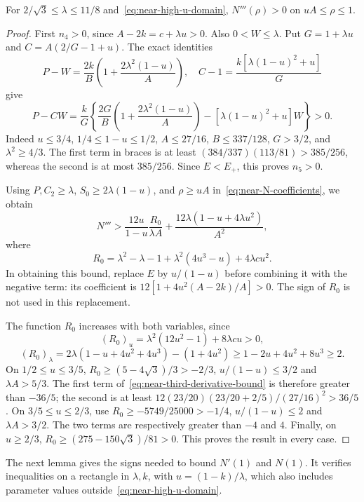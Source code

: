 \begin{lemma}\label{lem:near-high-curvature}
For $2/\sqrt3\le\lambda\le11/8$ and~\eqref{eq:near-high-u-domain}, $N'''(\rho)>0$ on $uA\le\rho\le1$.
\end{lemma}
\begin{proof}
First $n_4>0$, since $A-2k=c+\lambda u>0$. Also $0<W\le\lambda$. Put $G=1+\lambda u$ and $C=A(2/G-1+u)$. The exact identities
\[
 P-W=\frac{2k}{B}\left(1+\frac{2\lambda^2(1-u)}A\right),\quad
 C-1=\frac{k[\lambda(1-u)^2+u]}G
\]
give
\[
 P-CW=\frac kG\left\{\frac{2G}{B}
       \left(1+\frac{2\lambda^2(1-u)}A\right)
       -[\lambda(1-u)^2+u]W\right\}>0.
\]
Indeed $u\le3/4$, $1/4\le1-u\le1/2$, $A\le27/16$, $B\le337/128$, $G>3/2$, and $\lambda^2\ge4/3$. The first term in braces is at least $(384/337)(113/81)>385/256$, whereas the second is at most $385/256$. Since $E<E_+$, this proves $n_5>0$.

Using $P,C_2\ge\lambda$, $S_0\ge2\lambda(1-u)$, and $\rho\ge uA$ in~\eqref{eq:near-N-coefficients}, we obtain
\begin{equation}\label{eq:near-third-derivative-bound}
 N'''>\frac{12u}{1-u}\frac{R_0}{\lambda A}
              +\frac{12\lambda(1-u+4\lambda u^2)}{A^2},
\end{equation}
where
\[
 R_0=\lambda^2-\lambda-1+\lambda^2(4u^3-u)+4\lambda cu^2.
\]
In obtaining this bound, replace $E$ by $u/(1-u)$ before combining it with the negative term: its coefficient is $12[1+4u^2(A-2k)/A]>0$. The sign of $R_0$ is not used in this replacement.

The function $R_0$ increases with both variables, since
\[
 (R_0)_u=\lambda^2(12u^2-1)+8\lambda cu>0,
\]
\[
 (R_0)_\lambda=2\lambda(1-u+4u^2+4u^3)-(1+4u^2)
 \ge1-2u+4u^2+8u^3\ge2.
\]
On $1/2\le u\le3/5$, $R_0\ge(5-4\sqrt3)/3>-2/3$, $u/(1-u)\le3/2$ and $\lambda A>5/3$. The first term of~\eqref{eq:near-third-derivative-bound} is therefore greater than $-36/5$; the second is at least
$12(23/20)(23/20+2/5)/(27/16)^2>36/5$.
On $3/5\le u\le2/3$, use $R_0\ge-5749/25000>-1/4$, $u/(1-u)\le2$ and $\lambda A>3/2$. The two terms are respectively greater than $-4$ and $4$. Finally, on $u\ge2/3$,
$R_0\ge(275-150\sqrt3)/81>0$. This proves the result in every case.
\end{proof}

The next lemma gives the signs needed to bound $N'(1)$ and $N(1)$. It verifies inequalities on a rectangle in $\lambda,k$, with $u=(1-k)/\lambda$, which also includes parameter values outside~\eqref{eq:near-high-u-domain}.

